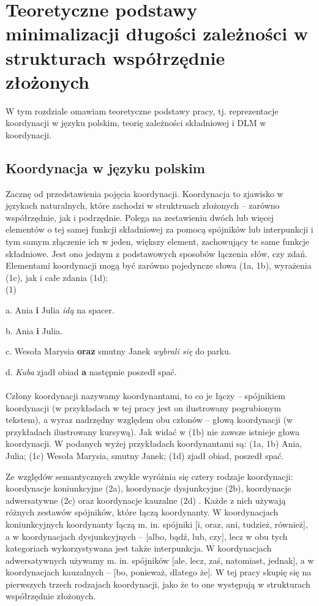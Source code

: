 \documentclass[licencjacka]{pracamgr_Kogni}
\begin{document}
\chapter{Teoretyczne podstawy minimalizacji długości zależności w strukturach współrzędnie złożonych}
W tym rozdziale omawiam teoretyczne podstawy pracy, tj. reprezentacje koordynacji w języku polskim, teorię zależności składniowej i DLM w koordynacji.

\section{Koordynacja w języku polskim}
Zacznę od przedstawienia pojęcia koordynacji. Koordynacja to zjawisko w językach naturalnych, które zachodzi w struktruach złożonych -- zarówno współrzędnie, jak i podrzędnie. Polega na zestawieniu dwóch lub więcej elementów o tej samej funkcji składniowej za pomocą spójników lub interpunkcji i tym samym złączenie ich w jeden, większy element, zachowujący te same funkcje składniowe. Jest ono jednym z podstawowych sposobów łączenia słów, czy zdań. Elementami koordynacji mogą być zarówno pojedyncze słowa (1a, 1b),  wyrażenia (1c), jak i całe zdania (1d):
\\

(1)

a. Ania \textbf{i} Julia \textit{idą} na spacer.

b. Ania \textbf{i} Julia.

c. Wesoła Marysia \textbf{oraz} smutny Janek \textit{wybrali się} do parku.

d. \textit{Kuba} zjadł obiad \textbf{a} następnie poszedł spać.
\\
\\
Człony koordynacji nazywamy koordynantami, to co je łączy -- spójnikiem koordynacji (w przykładach w tej pracy jest on ilustrowany pogrubionym tekstem), a wyraz nadrzędny względem obu członów -- głową koordynacji (w przykładach ilustrowany kursywą). Jak widać w (1b) nie zawsze istnieje głowa koordynacji.
W podanych wyżej przykładach koordynantami są: (1a, 1b) Ania, Julia; (1c) Wesoła Marysia, smutny Janek; (1d) zjadł obiad, poszedł spać.

Ze względów semantycznych zwykle wyróżnia się cztery rodzaje koordynacji: koordynacje koniunkcyjne (2a), koordynacje dysjunkcyjne (2b), koordynacje adwersatywne (2c) oraz koordynacje kauzalne (2d) \citep{Haspelmath2007}. Każde z nich używają różnych zestawów spójników, które łączą koordynanty. W koordynacjach koniunkcyjnych koordynanty łączą m. in. spójniki [i, oraz, ani, tudzież, również], a w koordynacjach dysjunkcyjnych -- [albo, bądź, lub, czy], lecz w obu tych kategoriach wykorzystywana jest także interpunkcja. W koordynacjach adwersatywnych używamy m. in. spójników [ale, lecz, zaś, natomiast, jednak], a w koordynacjach kauzalnych -- [bo, ponieważ, dlatego że]. W tej pracy skupię się na pierwszych trzech rodzajach koordynacji, jako że to one występują w strukturach współrzędnie złożonych.
\\
\end{document}

